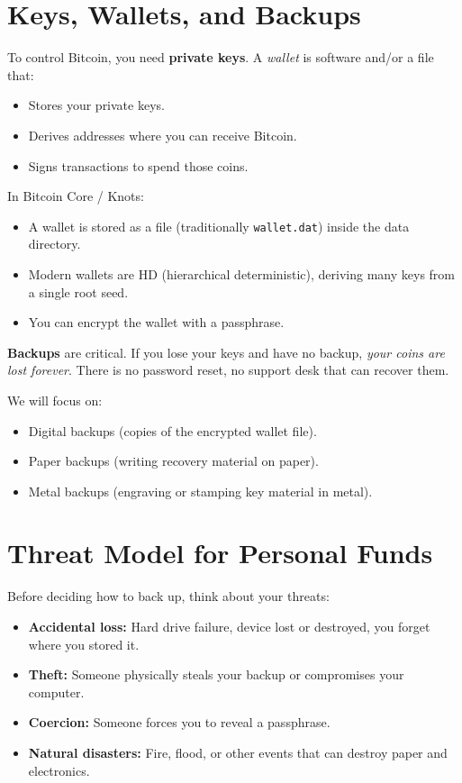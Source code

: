 \documentclass[12pt,a4paper]{book}
\begin{document}
\section{Keys, Wallets, and Backups}

To control Bitcoin, you need \textbf{private keys}. A \emph{wallet} is software and/or a file that:
\begin{itemize}
  \item Stores your private keys.
  \item Derives addresses where you can receive Bitcoin.
  \item Signs transactions to spend those coins.
\end{itemize}

In Bitcoin Core / Knots:
\begin{itemize}
  \item A wallet is stored as a file (traditionally \texttt{wallet.dat}) inside the data directory.
  \item Modern wallets are HD (hierarchical deterministic), deriving many keys from a single root seed.
  \item You can encrypt the wallet with a passphrase.
\end{itemize}

\textbf{Backups} are critical. If you lose your keys and have no backup, \emph{your coins are lost forever}. There is no password reset, no support desk that can recover them.

We will focus on:
\begin{itemize}
  \item Digital backups (copies of the encrypted wallet file).
  \item Paper backups (writing recovery material on paper).
  \item Metal backups (engraving or stamping key material in metal).
\end{itemize}

\section{Threat Model for Personal Funds}

Before deciding how to back up, think about your threats:

\begin{itemize}
  \item \textbf{Accidental loss:} Hard drive failure, device lost or destroyed, you forget where you stored it.
  \item \textbf{Theft:} Someone physically steals your backup or compromises your computer.
  \item \textbf{Coercion:} Someone forces you to reveal a passphrase.
  \item \textbf{Natural disasters:} Fire, flood, or other events that can destroy paper and electronics.
\end{itemize}
\end{document}
